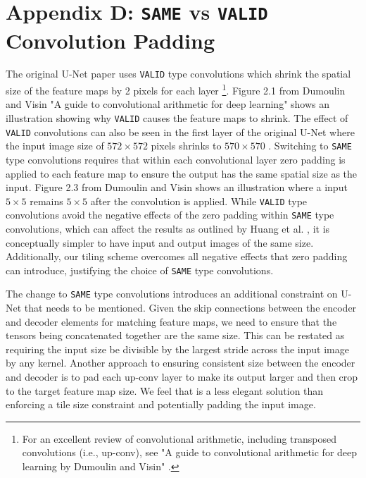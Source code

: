 \section{Appendix D: \texttt{SAME}  vs \texttt{VALID} Convolution Padding}

The original U-Net paper uses \texttt{VALID} type convolutions which shrink the spatial size of the feature maps by 2 pixels for each layer \cite{Dumoulin2018}\footnote{For an excellent review of convolutional arithmetic, including transposed convolutions (i.e., up-conv), see "A guide to convolutional arithmetic for deep learning by Dumoulin and Visin" \cite{Dumoulin2018}.}. 
Figure 2.1 from Dumoulin and Visin "A guide to convolutional arithmetic for deep learning" \cite{Dumoulin2018} shows an illustration showing why \texttt{VALID} causes the feature maps to shrink. The effect of \texttt{VALID} convolutions can also be seen in the first layer of the original U-Net where the input image size of $572 \times 572$ pixels shrinks to $570 \times 570$ \cite{Ronneberger2015a}. 
Switching to \texttt{SAME} type convolutions requires that within each convolutional layer zero padding is applied to each feature map to ensure the output has the same spatial size as the input. 
Figure 2.3 from Dumoulin and Visin \cite{Dumoulin2018} shows an illustration where a input $5 \times 5$ remains $5 \times 5$ after the convolution is applied. 
While \texttt{VALID} type convolutions avoid the negative effects of the zero padding within \texttt{SAME} type convolutions, which can affect the results as outlined by Huang et al. \cite{Huang2019a}, it is conceptually simpler to have input and output images of the same size. Additionally, our tiling scheme overcomes all negative effects that zero padding can introduce, justifying the choice of \texttt{SAME} type convolutions. 

The change to \texttt{SAME} type convolutions introduces an additional constraint on U-Net that needs to be mentioned. Given the skip connections between the encoder and decoder elements for matching feature maps, we need to ensure that the tensors being concatenated together are the same size. This can be restated as requiring the input size be divisible by the largest stride across the input image by any kernel. Another approach to ensuring consistent size between the encoder and decoder is to pad each up-conv layer to make its output larger and then crop to the target feature map size. We feel that is a less elegant solution than enforcing a tile size constraint and potentially padding the input image. 

